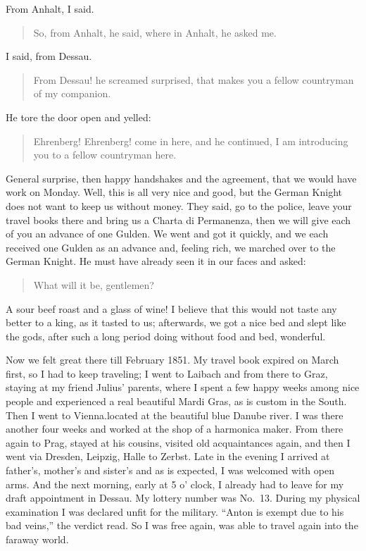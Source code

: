 From Anhalt, I said.

\begin{quote}
So, from Anhalt, he said, where in Anhalt, he asked me.
\end{quote}

I said, from Dessau.

\begin{quote}
From Dessau! he screamed surprised, that makes you a fellow countryman of my companion.
\end{quote}

He tore the door open and yelled:

\begin{quote}
Ehrenberg! Ehrenberg! come in here, and he continued, I am introducing you to a fellow countryman here.
\end{quote}

General surprise, then happy handshakes and the agreement, that we would have work on Monday. Well, this is all very nice and good, but the German Knight does not want to keep us without money. They said, go to the police, leave your travel books there and bring us a Charta di Permanenza, then we will give each of you an advance of one Gulden. We went and got it quickly, and we each received one Gulden as an advance and, feeling rich, we marched over to the German Knight. He must have already seen it in our faces and asked:

\begin{quote}
What will it be, gentlemen?
\end{quote}

A sour beef roast and a glass of wine! I believe that this would not taste any better to a king, as it tasted to us; afterwards, we got a nice bed and slept like the gods, after such a long period doing without food and bed, wonderful.

Now we felt great there till February 1851. My travel book expired on March first, so I had to keep traveling; I went to Laibach and from there to Graz, staying at my friend Julius' parents, where I spent a few happy weeks among nice people and experienced a real beautiful Mardi Gras, as is custom in the South. Then I went to Vienna.located at the beautiful blue Danube river. I was there another four weeks and worked at the shop of a harmonica maker. From there again to Prag, stayed at his cousins, visited old acquaintances again, and then I went via Dresden, Leipzig, Halle to Zerbst. Late in the evening I arrived at father's, mother's and sister's and as is expected, I was welcomed with open arms. And the next morning, early at 5 o' clock, I already had to leave for my draft appointment in Dessau. My lottery number was No.~13. During my physical examination I was declared unfit for the military. ``Anton is exempt due to his bad veins,'' the verdict read. So I was free again, was able to travel again into the faraway world.

